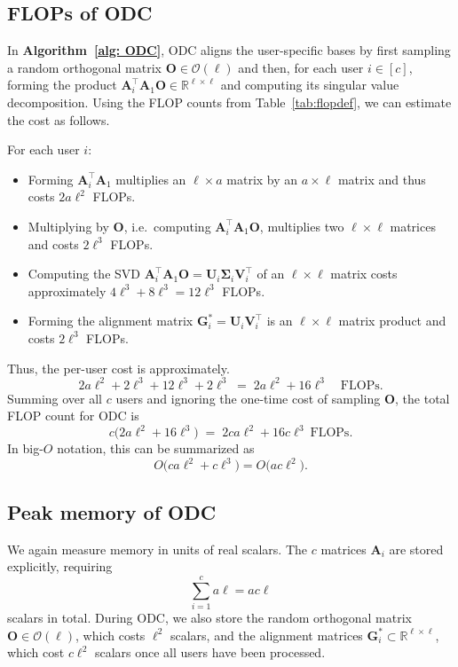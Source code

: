 \documentclass[final,3p,times]{elsarticle}
\theoremstyle{plain}
\newcommand{\matr}[1]{\bm{#1}}        %
\begin{document}
 
\subsection{FLOPs of ODC}
\label{subsec: ODC FLOPs}

In \textbf{Algorithm~\ref{alg: ODC}}, ODC aligns the user-specific bases by first sampling a random orthogonal matrix $\matr{O} \in \mathcal{O}(\ell)$ and then, for each user $i \in [c]$, forming the product
\(
\matr{A}_i^\top \matr{A}_1 \matr{O}
\in \mathbb{R}^{\ell \times \ell}
\)
and computing its singular value decomposition. Using the FLOP counts from Table~\ref{tab:flopdef}, we can estimate the cost as follows.

For each user $i$:
\begin{itemize}
  \item Forming $\matr{A}_i^\top \matr{A}_1$ multiplies an $\ell \times a$ matrix by an $a \times \ell$ matrix and thus costs $2 a \ell^{2}$ FLOPs.
  \item Multiplying by $\matr{O}$, i.e.\ computing $\matr{A}_i^\top \matr{A}_1 \matr{O}$, multiplies two $\ell \times \ell$ matrices and costs $2 \ell^{3}$ FLOPs.
  \item Computing the SVD
        $\matr{A}_i^\top \matr{A}_1 \matr{O} = \matr{U}_i \matr{\Sigma}_i \matr{V}_i^\top$ of an $\ell \times \ell$ matrix costs approximately $4 \ell^{3} + 8 \ell^{3} = 12 \ell^{3}$ FLOPs.
  \item Forming the alignment matrix $\matr{G}_i^* = \matr{U}_i \matr{V}_i^\top$ is an $\ell \times \ell$ matrix product and costs $2 \ell^{3}$ FLOPs.
\end{itemize}
Thus, the per-user cost is approximately.
\begin{equation}
2 a \ell^{2} + 2 \ell^{3} + 12 \ell^{3} + 2 \ell^{3} \;=\; 2 a \ell^{2} + 16 \ell^{3} \quad \text{FLOPs}.
\end{equation}
Summing over all $c$ users and ignoring the one-time cost of sampling $\matr{O}$, the total FLOP count for ODC is
\begin{equation}
\label{eq:odc-flops}
c \bigl(2 a \ell^{2} + 16 \ell^{3}\bigr) \;=\; 2 c a \ell^{2} + 16 c \ell^{3} \ \text{FLOPs}.
\end{equation}
In big-$O$ notation, this can be summarized as
\begin{equation}
O\bigl(c a \ell^{2} + c \ell^{3}\bigr) = O\bigl(a c \ell^{2}\bigr).
\end{equation}

\subsection{Peak memory of ODC}
\label{subsec: ODC memory}
We again measure memory in units of real scalars. The $c$ matrices $\matr{A}_i$ are stored explicitly, requiring
\begin{equation}
\sum_{i=1}^c a \ell = a c \ell
\end{equation}
scalars in total. During ODC, we also store the random orthogonal matrix $\matr{O} \in \mathcal{O}(\ell)$, which costs $\ell^{2}$ scalars, and the alignment matrices $\matr{G}_i^* \subset \mathbb{R}^{\ell \times \ell}$, which cost $c \ell^{2}$ scalars once all users have been processed.
\end{document}
